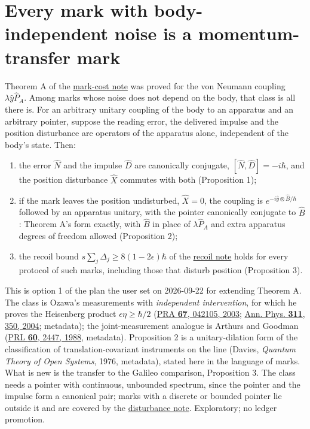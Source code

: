 \documentclass[11pt,a4paper]{article}
\newcommand{\tightlist}{\setlength{\itemsep}{0pt}\setlength{\parskip}{0pt}}
\begin{document}
\hypertarget{every-mark-with-body-independent-noise-is-a-momentum-transfer-mark}{%
\section{Every mark with body-independent noise is a momentum-transfer
mark}\label{every-mark-with-body-independent-noise-is-a-momentum-transfer-mark}}

Theorem A of the \href{mark-cost-and-statistical-floor.md}{mark-cost
note} was proved for the von Neumann coupling \(\lambda\hat y\hat P_A\).
Among marks whose noise does not depend on the body, that class is all
there is. For an arbitrary unitary coupling of the body to an apparatus
and an arbitrary pointer, suppose the reading error, the delivered
impulse and the position disturbance are operators of the apparatus
alone, independent of the body's state. Then:

\begin{enumerate}
\def\labelenumi{\arabic{enumi}.}
\tightlist
\item
  the error \(\hat N\) and the impulse \(\hat D\) are canonically
  conjugate, \([\hat N,\hat D]=-i\hbar\), and the position disturbance
  \(\hat X\) commutes with both (Proposition 1);
\item
  if the mark leaves the position undisturbed, \(\hat X=0\), the
  coupling is \(e^{-i\hat y\otimes\hat B/\hbar}\) followed by an
  apparatus unitary, with the pointer canonically conjugate to
  \(\hat B\): Theorem A's form exactly, with \(\hat B\) in place of
  \(\lambda\hat P_A\) and extra apparatus degrees of freedom allowed
  (Proposition 2);
\item
  the recoil bound \(s\sum_j\Delta_j\ge8(1-2\epsilon)\hbar\) of the
  \href{record-costs-recoil.md}{recoil note} holds for every protocol of
  such marks, including those that disturb position (Proposition 3).
\end{enumerate}

This is option 1 of the plan the user set on 2026-09-22 for extending
Theorem A. The class is Ozawa's measurements with \emph{independent
intervention}, for which he proves the Heisenberg product
\(\epsilon\eta\ge\hbar/2\)
(\href{https://doi.org/10.1103/PhysRevA.67.042105}{PRA \textbf{67},
042105, 2003}; \href{https://doi.org/10.1016/j.aop.2003.12.012}{Ann.
Phys. \textbf{311}, 350, 2004}; metadata); the joint-measurement
analogue is Arthurs and Goodman
(\href{https://doi.org/10.1103/PhysRevLett.60.2447}{PRL \textbf{60},
2447, 1988}, metadata). Proposition 2 is a unitary-dilation form of the
classification of translation-covariant instruments on the line (Davies,
\emph{Quantum Theory of Open Systems}, 1976, metadata), stated here in
the language of marks. What is new is the transfer to the Galileo
comparison, Proposition 3. The class needs a pointer with continuous,
unbounded spectrum, since the pointer and the impulse form a canonical
pair; marks with a discrete or bounded pointer lie outside it and are
covered by the \href{record-costs-disturbance.md}{disturbance note}.
Exploratory; no ledger promotion.
\end{document}
